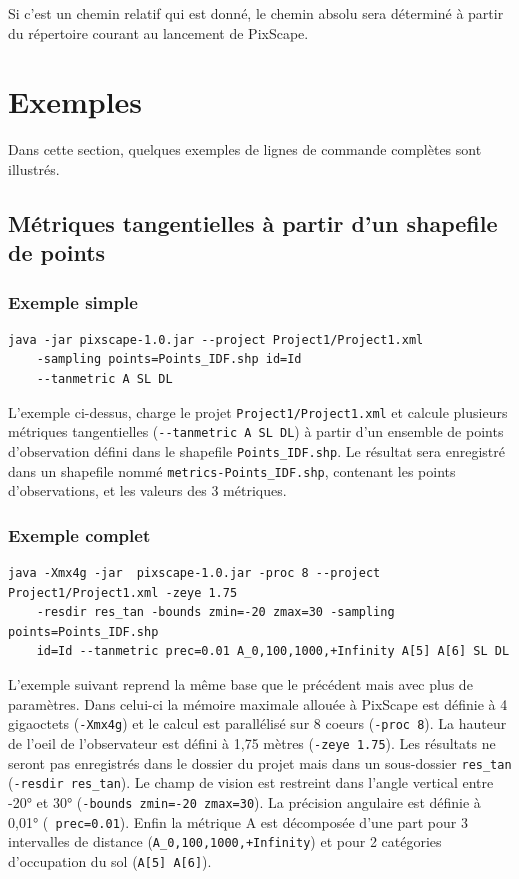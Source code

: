 \documentclass{report}
\begin{document}
Si c'est un chemin relatif qui est donné, le chemin absolu sera déterminé à partir du répertoire courant au lancement de PixScape.

\section{Exemples}

Dans cette section, quelques exemples de lignes de commande complètes sont illustrés.

\subsection{Métriques tangentielles à partir d'un shapefile de points}
\subsubsection{Exemple simple}
\begin{Verbatim}
java -jar pixscape-1.0.jar --project Project1/Project1.xml 
	-sampling points=Points_IDF.shp id=Id 
	--tanmetric A SL DL
\end{Verbatim}

L'exemple ci-dessus, charge le projet \verb|Project1/Project1.xml| et calcule plusieurs métriques tangentielles (\verb|--tanmetric A SL DL|) à partir d'un ensemble de points d'observation défini dans le shapefile \verb|Points_IDF.shp|. Le résultat sera enregistré dans un shapefile nommé \verb|metrics-Points_IDF.shp|, contenant les points d'observations, et les valeurs des 3 métriques.

\subsubsection{Exemple complet}
\begin{Verbatim}
java -Xmx4g -jar  pixscape-1.0.jar -proc 8 --project Project1/Project1.xml -zeye 1.75
	-resdir res_tan -bounds zmin=-20 zmax=30 -sampling points=Points_IDF.shp 
	id=Id --tanmetric prec=0.01 A_0,100,1000,+Infinity A[5] A[6] SL DL
\end{Verbatim}

L'exemple suivant reprend la même base que le précédent mais avec plus de paramètres. Dans celui-ci la mémoire maximale allouée à PixScape est définie à 4 gigaoctets (\verb|-Xmx4g|) et le calcul est parallélisé sur 8 coeurs (\verb|-proc 8|). La hauteur de l'oeil de l'observateur est défini à 1,75 mètres (\verb|-zeye 1.75|). Les résultats ne seront pas enregistrés dans le dossier du projet mais dans un sous-dossier \verb|res_tan| (\verb|-resdir res_tan|). Le champ de vision est restreint dans l'angle vertical entre -20° et 30° (\verb|-bounds zmin=-20 zmax=30|). La précision angulaire est définie à 0,01° (\verb| prec=0.01|). Enfin la métrique A est décomposée d'une part pour 3 intervalles de distance (\verb|A_0,100,1000,+Infinity|) et pour 2 catégories d'occupation du sol (\verb|A[5] A[6]|).
\end{document}
